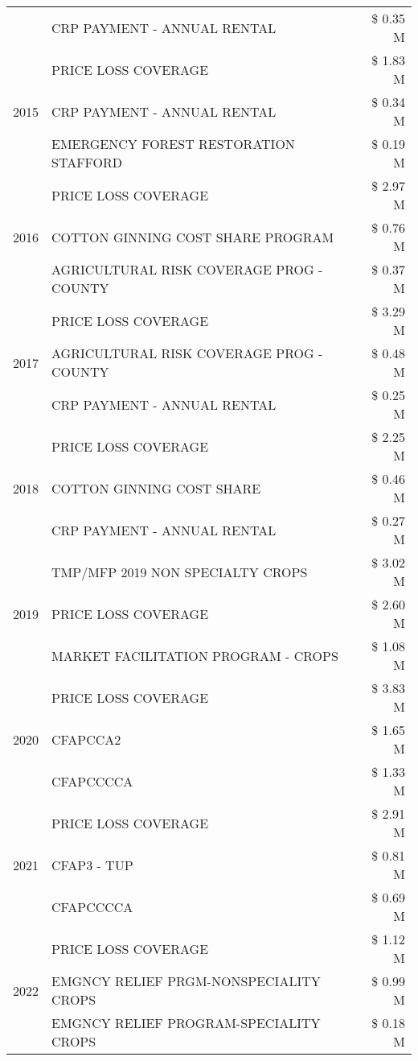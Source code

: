 \begin{tabular}{llr}
 & CRP PAYMENT - ANNUAL RENTAL & \$ 0.35 M \\
\cline{1-3}
\multirow[t]{3}{*}{2015} & PRICE LOSS COVERAGE & \$ 1.83 M \\
 & CRP PAYMENT - ANNUAL RENTAL & \$ 0.34 M \\
 & EMERGENCY FOREST RESTORATION STAFFORD & \$ 0.19 M \\
\cline{1-3}
\multirow[t]{3}{*}{2016} & PRICE LOSS COVERAGE & \$ 2.97 M \\
 & COTTON GINNING COST SHARE PROGRAM & \$ 0.76 M \\
 & AGRICULTURAL RISK COVERAGE PROG - COUNTY & \$ 0.37 M \\
\cline{1-3}
\multirow[t]{3}{*}{2017} & PRICE LOSS COVERAGE & \$ 3.29 M \\
 & AGRICULTURAL RISK COVERAGE PROG - COUNTY & \$ 0.48 M \\
 & CRP PAYMENT - ANNUAL RENTAL & \$ 0.25 M \\
\cline{1-3}
\multirow[t]{3}{*}{2018} & PRICE LOSS COVERAGE & \$ 2.25 M \\
 & COTTON GINNING COST SHARE & \$ 0.46 M \\
 & CRP PAYMENT - ANNUAL RENTAL & \$ 0.27 M \\
\cline{1-3}
\multirow[t]{3}{*}{2019} & TMP/MFP 2019 NON SPECIALTY CROPS & \$ 3.02 M \\
 & PRICE LOSS COVERAGE & \$ 2.60 M \\
 & MARKET FACILITATION PROGRAM - CROPS & \$ 1.08 M \\
\cline{1-3}
\multirow[t]{3}{*}{2020} & PRICE LOSS COVERAGE & \$ 3.83 M \\
 & CFAPCCA2 & \$ 1.65 M \\
 & CFAPCCCCA & \$ 1.33 M \\
\cline{1-3}
\multirow[t]{3}{*}{2021} & PRICE LOSS COVERAGE & \$ 2.91 M \\
 & CFAP3 - TUP & \$ 0.81 M \\
 & CFAPCCCCA & \$ 0.69 M \\
\cline{1-3}
\multirow[t]{3}{*}{2022} & PRICE LOSS COVERAGE & \$ 1.12 M \\
 & EMGNCY RELIEF PRGM-NONSPECIALITY CROPS & \$ 0.99 M \\
 & EMGNCY RELIEF PROGRAM-SPECIALITY CROPS & \$ 0.18 M \\
\cline{1-3}
\bottomrule
\end{tabular}
